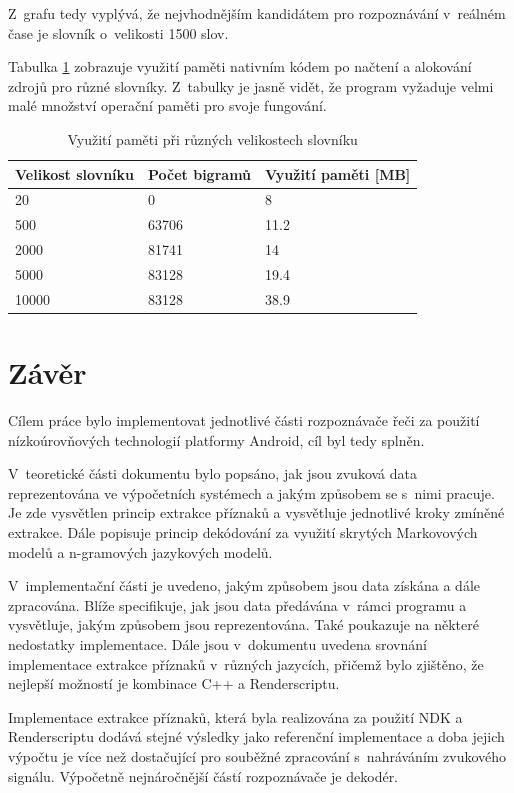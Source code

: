 Z~grafu tedy vyplývá, že nejvhodnějším kandidátem pro rozpoznávání v~reálném čase je slovník o~velikosti 1500 slov.

Tabulka \ref{tab:memory_usage} zobrazuje využití paměti nativním kódem po načtení a alokování zdrojů pro různé slovníky. Z~tabulky je jasně vidět, že program vyžaduje velmi malé množství operační paměti pro svoje fungování.

\begin{table}[H]
\centering
\caption{Využití paměti při různých velikostech slovníku}
\label{tab:memory_usage}
\begin{tabular}{|l|l|l|}
\hline
Velikost slovníku & Počet bigramů & Využití paměti [MB] \\ \hline
20                & 0             & 8            \\ \hline
500               & 63706         & 11.2       \\ \hline
2000              & 81741         & 14        \\ \hline
5000              & 83128         & 19.4      \\ \hline
10000             & 83128         & 38.9        \\ \hline
\end{tabular}
\end{table}

\chapter{Závěr}
Cílem práce bylo implementovat jednotlivé části rozpoznávače řeči za použití nízkoúrovňových technologií platformy Android, cíl byl tedy splněn.

V~teoretické části dokumentu bylo popsáno, jak jsou zvuková data reprezentována ve výpočetních systémech a jakým způsobem se s~nimi pracuje. Je zde vysvětlen princip extrakce příznaků a vysvětluje jednotlivé kroky zmíněné extrakce. Dále popisuje princip dekódování za využití skrytých Markovových modelů a n-gramových jazykových modelů.

V~implementační části je uvedeno, jakým způsobem jsou data získána a dále zpracována. Blíže specifikuje, jak jsou data předávána v~rámci programu a vysvětluje, jakým způsobem jsou reprezentována. Také poukazuje na některé nedostatky implementace. Dále jsou v~dokumentu uvedena srovnání implementace extrakce příznaků v~různých jazycích, přičemž bylo zjištěno, že nejlepší možností je kombinace C++ a Renderscriptu.

Implementace extrakce příznaků, která byla realizována za použití NDK a Renderscriptu dodává stejné výsledky jako referenční implementace a doba jejich výpočtu je více než dostačující pro souběžné zpracování s~nahráváním zvukového signálu. Výpočetně nejnáročnější částí rozpoznávače je dekodér.

